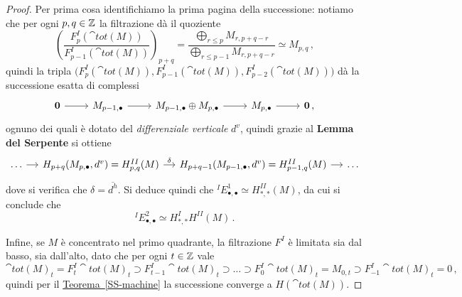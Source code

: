\begin{ex!}
\begin{thm}
\begin{proof}
			Per prima cosa identifichiamo la prima pagina della successione:
			notiamo che per ogni $p,q \in {\mathbb Z}$ la filtrazione dà il quoziente
			\begin{equation*}
					\left( \frac{F_{p}^{I}(\cat{tot}(M))}{F_{p-1}^{I}(\cat{tot}(M))} \right)_{p+q}
					=  \frac{\bigoplus_{r \le p} M_{r, p + q - r}}{\bigoplus_{r \le p-1} M_{r,p+q-r}}
					\simeq M_{p,q}\,,
			\end{equation*}
			quindi la tripla $\big(F^{I}_{p}(\cat{tot}(M)), F^{I}_{p-1}(\cat{tot}(M)), 
			F^{I}_{p-2}(\cat{tot}(M))\big)$ dà la successione esatta di complessi
			\begin{equation*}
				\begin{tikzcd}
					\cat{0} \ar[r]
					& M_{p-1,\bullet} \ar[r]
					& M_{p-1,\bullet} \oplus M_{p,\bullet} \ar[r]
					& M_{p,\bullet} \ar[r]
					& \cat{0}\,,
				\end{tikzcd}
			\end{equation*}
			ognuno dei quali è dotato del \emph{differenziale verticale} $d^{v}$,
			quindi grazie al \textbf{Lemma del Serpente} si ottiene
			\begin{equation*}
				\begin{tikzcd}[column sep=small]
					\dots \ar[r]
					& H_{p+q}(M_{p,\bullet}, d^{v}) = H^{II}_{p,q}(M) \ar[r, "\delta"]
					& H_{p+q-1}(M_{p-1,\bullet}, d^{v}) = H^{II}_{p-1,q}(M) \ar[r]
					& \dots
				\end{tikzcd}
			\end{equation*}
			dove si verifica che $\delta = \overline{d^{h}}$. Si deduce quindi che
			${}^{I}E_{\bullet,\bullet}^{1} \simeq H^{II}_{*,*}(M)$, 
			da cui si conclude che
			\begin{equation*}
				{}^{I}E_{\bullet,\bullet}^{2} \simeq H^{I}_{*,*}H^{II}(M)\,.
			\end{equation*}
			
			Infine, se $M$ è concentrato nel primo quadrante, 
			la filtrazione $F^{I}$ è limitata sia dal basso, sia dall'alto,
			dato che per ogni $t \in {\mathbb Z}$ vale
			\begin{equation*}
				\cat{tot}(M)_{t} =  F^{I}_{t}\cat{tot}(M)_{t} 
				\supset F^{I}_{t-1}\cat{tot}(M)_{t}
				\supset \dots \supset F^{I}_{0}\cat{tot}(M)_{t} 
				= M_{0,t} \supset F^{I}_{-1}\cat{tot}(M)_{t}  = 0\,,
			\end{equation*}			
			quindi per il \hyperref[SS-machine]{Teorema~\ref{SS-machine}}
			la successione converge a $H(\cat{tot}(M))$.
		\end{proof}
	\end{thm}
\end{ex!}

